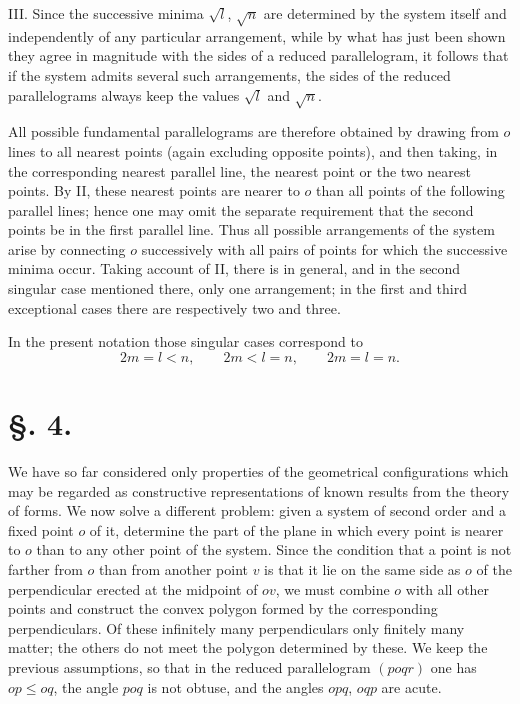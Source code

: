 \documentclass[11pt]{article}
\begin{document}
III. Since the successive minima $\sqrt l$, $\sqrt n$ are determined by the system itself and independently of any particular arrangement, while by what has just been shown they agree in magnitude with the sides of a reduced parallelogram, it follows that if the system admits several such arrangements, the sides of the reduced parallelograms always keep the values $\sqrt l$ and $\sqrt n$.

All possible fundamental parallelograms are therefore obtained by drawing from $o$ lines to all nearest points (again excluding opposite points), and then taking, in the corresponding nearest parallel line, the nearest point or the two nearest points. By II, these nearest points are nearer to $o$ than all points of the following parallel lines; hence one may omit the separate requirement that the second points be in the first parallel line. Thus all possible arrangements of the system arise by connecting $o$ successively with all pairs of points for which the successive minima occur. Taking account of II, there is in general, and in the second singular case mentioned there, only one arrangement; in the first and third exceptional cases there are respectively two and three.

In the present notation those singular cases correspond to
\[
 2m=l<n,
 \qquad 2m<l=n,
 \qquad 2m=l=n.
\]

\section*{§. 4.}

We have so far considered only properties of the geometrical configurations which may be regarded as constructive representations of known results from the theory of forms. We now solve a different problem: given a system of second order and a fixed point $o$ of it, determine the part of the plane in which every point is nearer to $o$ than to any other point of the system. Since the condition that a point is not farther from $o$ than from another point $v$ is that it lie on the same side as $o$ of the perpendicular erected at the midpoint of $ov$, we must combine $o$ with all other points and construct the convex polygon formed by the corresponding perpendiculars. Of these infinitely many perpendiculars only finitely many matter; the others do not meet the polygon determined by these. We keep the previous assumptions, so that in the reduced parallelogram $(poqr)$ one has $op\le oq$, the angle $poq$ is not obtuse, and the angles $opq$, $oqp$ are acute.
\end{document}
